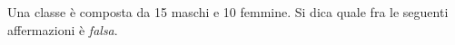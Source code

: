 Una classe è composta da 15 maschi e 10 femmine. 
Si dica quale fra le seguenti affermazioni è \emph{falsa}.